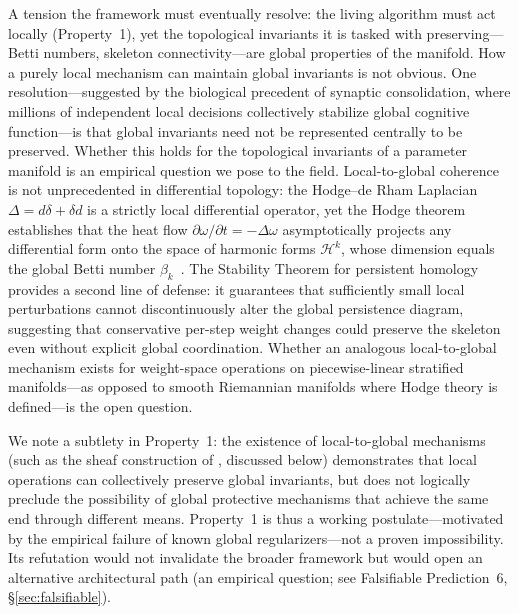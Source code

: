 \documentclass{article}
\begin{document}
\begin{enumerate}
A tension the framework must eventually resolve: the living algorithm must act locally (Property~1), yet the topological invariants it is tasked with preserving---Betti numbers, skeleton connectivity---are global properties of the manifold. How a purely local mechanism can maintain global invariants is not obvious. One resolution---suggested by the biological precedent of synaptic consolidation, where millions of independent local decisions collectively stabilize global cognitive function---is that global invariants need not be represented centrally to be preserved. Whether this holds for the topological invariants of a parameter manifold is an empirical question we pose to the field. Local-to-global coherence is not unprecedented in differential topology: the Hodge--de Rham Laplacian $\Delta = d\delta + \delta d$ is a strictly local differential operator, yet the Hodge theorem establishes that the heat flow $\partial\omega/\partial t = -\Delta\omega$ asymptotically projects any differential form onto the space of harmonic forms $\mathcal{H}^k$, whose dimension equals the global Betti number $\beta_k$~\citep{Jost2011riemannian}. The Stability Theorem for persistent homology~\citep{CohenSteiner2007stability} provides a second line of defense: it guarantees that sufficiently small local perturbations cannot discontinuously alter the global persistence diagram, suggesting that conservative per-step weight changes could preserve the skeleton even without explicit global coordination. Whether an analogous local-to-global mechanism exists for weight-space operations on piecewise-linear stratified manifolds---as opposed to smooth Riemannian manifolds where Hodge theory is defined---is the open question.

We note a subtlety in Property~1: the existence of local-to-global mechanisms (such as the sheaf construction of \citet{Bosca2026sheaf}, discussed below) demonstrates that local operations can collectively preserve global invariants, but does not logically preclude the possibility of global protective mechanisms that achieve the same end through different means. Property~1 is thus a working postulate---motivated by the empirical failure of known global regularizers---not a proven impossibility. Its refutation would not invalidate the broader framework but would open an alternative architectural path (an empirical question; see Falsifiable Prediction~6, \S\ref{sec:falsifiable}).


\end{enumerate}
\end{document}
